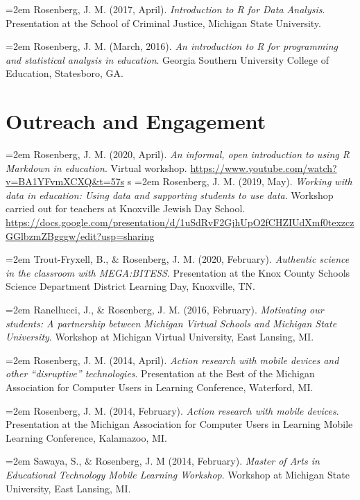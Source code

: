 \documentclass[
  14,
]{article}
\begin{document}
\hangindent=2em Rosenberg, J. M. (2017, April). \emph{Introduction to R
for Data Analysis}. Presentation at the School of Criminal Justice,
Michigan State University.

\hangindent=2em Rosenberg, J. M. (March, 2016). \emph{An introduction to
R for programming and statistical analysis in education}. Georgia
Southern University College of Education, Statesboro, GA.

\hypertarget{outreach-and-engagement}{%
\section{Outreach and Engagement}\label{outreach-and-engagement}}

\hangindent=2em Rosenberg, J. M. (2020, April). \emph{An informal, open
introduction to using R Markdown in education}. Virtual workshop.
\url{https://www.youtube.com/watch?v=BA1YFvmXCXQ\&t=57s} s
\hangindent=2em Rosenberg, J. M. (2019, May). \emph{Working with data in
education: Using data and supporting students to use data}. Workshop
carried out for teachers at Knoxville Jewish Day School.
\url{https://docs.google.com/presentation/d/1uSdRvF2GjhUpO2fCHZIUdXmf0texzczGGlbzmZBgggw/edit?usp=sharing}

\hangindent=2em Trout-Fryxell, B., \& Rosenberg, J. M. (2020, February).
\emph{Authentic science in the classroom with MEGA:BITESS}. Presentation
at the Knox County Schools Science Department District Learning Day,
Knoxville, TN.

\hangindent=2em Ranellucci, J., \& Rosenberg, J. M. (2016, February).
\emph{Motivating our students: A partnership between Michigan Virtual
Schools and Michigan State University}. Workshop at Michigan Virtual
University, East Lansing, MI.

\hangindent=2em Rosenberg, J. M. (2014, April). \emph{Action research
with mobile devices and other ``disruptive'' technologies}. Presentation
at the Best of the Michigan Association for Computer Users in Learning
Conference, Waterford, MI.

\hangindent=2em Rosenberg, J. M. (2014, February). \emph{Action research
with mobile devices}. Presentation at the Michigan Association for
Computer Users in Learning Mobile Learning Conference, Kalamazoo, MI.

\hangindent=2em Sawaya, S., \& Rosenberg, J. M (2014, February).
\emph{Master of Arts in Educational Technology Mobile Learning
Workshop}. Workshop at Michigan State University, East Lansing, MI.
\end{document}
